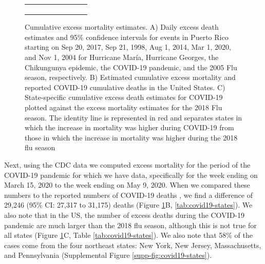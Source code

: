 \documentclass[11pt]{article}
\begin{document}
\begin{figure}[ht]
\begin{tabular}{lll}
\begin{subfigure}[t]{0.3\linewidth}
	\end{subfigure}\\
	\end{tabular}
    \caption{Cumulative excess mortality estimates. A) Daily excess death estimates and 95\% confidence intervals for events in Puerto Rico starting on Sep 20, 2017, Sep 21, 1998, Aug 1, 2014, Mar 1, 2020, and Nov 1, 2004 for Hurricane Mar\'ia, Hurricane Georges, the Chikungunya epidemic, the COVID-19 pandemic, and the 2005 Flu season, respectively.  B) Estimated cumulative excess mortality and reported COVID-19 cumulative deaths in the United States. C) State-specific cumulative excess death estimates for COVID-19 plotted against the excess mortality estimates for the 2018 Flu season. The identity line is represented in red and separates states in which the increase in mortality was higher during COVID-19 from those in which the increase in mortality was higher during the 2018 flu season}
    \label{fig:excess-deaths}
\end{figure}

Next, using the CDC data we computed excess mortality for the period of the COVID-19 pandemic for which we have data, specifically for the week ending on March 15, 2020 to the week ending on May 9, 2020. When we compared these numbers to the reported numbers of COVID-19 deaths \cite{smith2020coronavirus}, we find a difference of 29,246 (95\% CI: 27,317 to 31,175) deaths (Figure \ref{fig:excess-deaths}B, \ref{tab:covid19-states}). We also note that in the US, the number of excess deaths during the COVID-19 pandemic are much larger than the 2018 flu season, although this is not true for all states (Figure \ref{fig:excess-deaths}C, Table \ref{tab:covid19-states}). We also note that 58\% of the cases come from the four northeast states: New York, New Jersey, Massachusetts, and Pennsylvania (Supplemental Figure \ref{supp-fig:covid19-states}).
\end{document}

